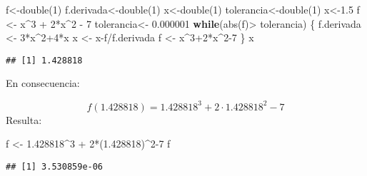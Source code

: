 \documentclass[
]{article}
\newenvironment{Shaded}{\begin{snugshade}}{\end{snugshade}}
\newcommand{\ControlFlowTok}[1]{\textcolor[rgb]{0.13,0.29,0.53}{\textbf{#1}}}
\newcommand{\DecValTok}[1]{\textcolor[rgb]{0.00,0.00,0.81}{#1}}
\newcommand{\FloatTok}[1]{\textcolor[rgb]{0.00,0.00,0.81}{#1}}
\newcommand{\FunctionTok}[1]{\textcolor[rgb]{0.00,0.00,0.00}{#1}}
\newcommand{\NormalTok}[1]{#1}
\newcommand{\OtherTok}[1]{\textcolor[rgb]{0.56,0.35,0.01}{#1}}
\newcommand{\SpecialCharTok}[1]{\textcolor[rgb]{0.00,0.00,0.00}{#1}}
\begin{document}
\begin{Shaded}
\begin{Highlighting}[]
\NormalTok{f}\OtherTok{\textless{}{-}}\FunctionTok{double}\NormalTok{(}\DecValTok{1}\NormalTok{)}
\NormalTok{f.derivada}\OtherTok{\textless{}{-}}\FunctionTok{double}\NormalTok{(}\DecValTok{1}\NormalTok{)}
\NormalTok{x}\OtherTok{\textless{}{-}}\FunctionTok{double}\NormalTok{(}\DecValTok{1}\NormalTok{)}
\NormalTok{tolerancia}\OtherTok{\textless{}{-}}\FunctionTok{double}\NormalTok{(}\DecValTok{1}\NormalTok{)}
\NormalTok{x}\OtherTok{\textless{}{-}}\FloatTok{1.5}
\NormalTok{f }\OtherTok{\textless{}{-}}\NormalTok{ x}\SpecialCharTok{\^{}}\DecValTok{3} \SpecialCharTok{+} \DecValTok{2}\SpecialCharTok{*}\NormalTok{x}\SpecialCharTok{\^{}}\DecValTok{2} \SpecialCharTok{{-}} \DecValTok{7}
\NormalTok{tolerancia}\OtherTok{\textless{}{-}} \FloatTok{0.000001}
\ControlFlowTok{while}\NormalTok{(}\FunctionTok{abs}\NormalTok{(f)}\SpecialCharTok{\textgreater{}}\NormalTok{ tolerancia) }
\NormalTok{\{}
\NormalTok{  f.derivada }\OtherTok{\textless{}{-}} \DecValTok{3}\SpecialCharTok{*}\NormalTok{x}\SpecialCharTok{\^{}}\DecValTok{2}\SpecialCharTok{+}\DecValTok{4}\SpecialCharTok{*}\NormalTok{x}
\NormalTok{  x }\OtherTok{\textless{}{-}}\NormalTok{ x}\SpecialCharTok{{-}}\NormalTok{f}\SpecialCharTok{/}\NormalTok{f.derivada}
\NormalTok{  f }\OtherTok{\textless{}{-}}\NormalTok{ x}\SpecialCharTok{\^{}}\DecValTok{3}\SpecialCharTok{+}\DecValTok{2}\SpecialCharTok{*}\NormalTok{x}\SpecialCharTok{\^{}}\DecValTok{2{-}7}
\NormalTok{  \}}
\NormalTok{x}
\end{Highlighting}
\end{Shaded}

\begin{verbatim}
## [1] 1.428818
\end{verbatim}

En consecuencia:

\[
f(1.428818)=1.428818^3+2 \cdot 1.428818^2-7
\] Resulta:

\begin{Shaded}
\begin{Highlighting}[]
\NormalTok{f }\OtherTok{\textless{}{-}} \FloatTok{1.428818}\SpecialCharTok{\^{}}\DecValTok{3} \SpecialCharTok{+} \DecValTok{2}\SpecialCharTok{*}\NormalTok{(}\FloatTok{1.428818}\NormalTok{)}\SpecialCharTok{\^{}}\DecValTok{2{-}7}
\NormalTok{f}
\end{Highlighting}
\end{Shaded}

\begin{verbatim}
## [1] 3.530859e-06
\end{verbatim}
\end{document}
